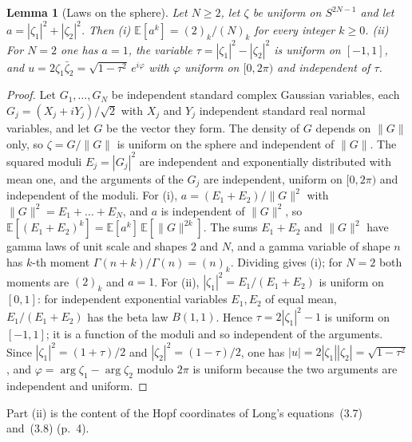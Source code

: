 \documentclass[11pt]{article}
\newtheorem{lemma}{Lemma}
\theoremstyle{remark}
\begin{document}
\begin{lemma}[Laws on the sphere]\label{lem:laws}
Let $N\ge2$, let $\zeta$ be uniform on $S^{2N-1}$ and let $a=|\zeta_1|^2+|\zeta_2|^2$. Then (i) $\mathbb E[a^k]=(2)_k/(N)_k$ for every integer $k\ge0$. (ii) For $N=2$ one has $a=1$, the variable $\tau=|\zeta_1|^2-|\zeta_2|^2$ is uniform on $[-1,1]$, and $u=2\zeta_1\bar\zeta_2=\sqrt{1-\tau^2}\,e^{i\varphi}$ with $\varphi$ uniform on $[0,2\pi)$ and independent of $\tau$.
\end{lemma}
\begin{proof}
Let $G_1,\dots,G_N$ be independent standard complex Gaussian variables, each $G_j=(X_j+iY_j)/\sqrt2$ with $X_j$ and $Y_j$ independent standard real normal variables, and let $G$ be the vector they form. The density of $G$ depends on $\|G\|$ only, so $\zeta=G/\|G\|$ is uniform on the sphere and independent of $\|G\|$. The squared moduli $E_j=|G_j|^2$ are independent and exponentially distributed with mean one, and the arguments of the $G_j$ are independent, uniform on $[0,2\pi)$ and independent of the moduli. For (i), $a=(E_1+E_2)/\|G\|^2$ with $\|G\|^2=E_1+\dots+E_N$, and $a$ is independent of $\|G\|^2$, so $\mathbb E[(E_1+E_2)^k]=\mathbb E[a^k]\,\mathbb E[\|G\|^{2k}]$. The sums $E_1+E_2$ and $\|G\|^2$ have gamma laws of unit scale and shapes $2$ and $N$, and a gamma variable of shape $n$ has $k$-th moment $\Gamma(n+k)/\Gamma(n)=(n)_k$. Dividing gives (i); for $N=2$ both moments are $(2)_k$ and $a=1$. For (ii), $|\zeta_1|^2=E_1/(E_1+E_2)$ is uniform on $[0,1]$: for independent exponential variables $E_1,E_2$ of equal mean, $E_1/(E_1+E_2)$ has the beta law $B(1,1)$. Hence $\tau=2|\zeta_1|^2-1$ is uniform on $[-1,1]$; it is a function of the moduli and so independent of the arguments. Since $|\zeta_1|^2=(1+\tau)/2$ and $|\zeta_2|^2=(1-\tau)/2$, one has $|u|=2|\zeta_1||\zeta_2|=\sqrt{1-\tau^2}$, and $\varphi=\arg\zeta_1-\arg\zeta_2$ modulo $2\pi$ is uniform because the two arguments are independent and uniform. \qedhere
\end{proof}

Part (ii) is the content of the Hopf coordinates of Long's equations~(3.7) and~(3.8) (p.~4).
\end{document}
